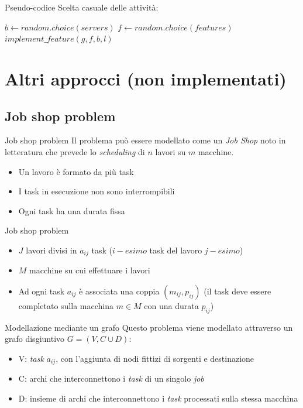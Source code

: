\documentclass{beamer}
\begin{document}
\begin{frame}{Pseudo-codice}
Scelta casuale delle attività:
\begin{algorithm}[H]
\begin{algorithmic}[1]
            \State $b \gets random.choice(servers)$
            \State $f \gets random.choice(features)$
            \State $implement\_feature(g, f, b, l)$
        \EndIf
    \EndFor
\EndFor
\end{algorithmic}
\end{algorithm}
\end{frame}

\section{Altri approcci (non implementati)}

\subsection{Job shop problem \cite{blazewicz2000disjunctive}}

\begin{frame}{Job shop problem}
Il problema può essere modellato come un \textit{Job Shop} noto in letteratura che prevede lo \textit{scheduling} di $n$ lavori su $m$ macchine.
\begin{itemize}
    \item Un lavoro è formato da più task
    \item I task in esecuzione non sono interrompibili
    \item Ogni task ha una durata fissa
\end{itemize}
\end{frame}

\begin{frame}{Job shop problem}
    \begin{itemize}
        \item $J$ lavori divisi in $a_{ij}$ task ($i-esimo$ task del lavoro $j-esimo$)
        \item $M$ macchine su cui effettuare i lavori
        \item Ad ogni task $a_{ij}$ è associata una coppia $(m_{ij},p_{ij})$ (il task deve essere completato sulla macchina $m \in M$ con una durata $p_{ij}$)
    \end{itemize}
\end{frame}

\begin{frame}{Modellazione mediante un grafo}
    Questo problema viene modellato attraverso un grafo disgiuntivo $G = (V, C \cup D)$:
    \begin{itemize}
        \item V: \textit{task} $a_{ij}$, con l'aggiunta di nodi fittizi di sorgenti e destinazione
        \item C: archi che interconnettono i \textit{task} di un singolo \textit{job}
        \item D: insieme di archi che interconnettono i \textit{task} processati sulla stessa macchina
    \end{itemize}
\end{frame}
\end{document}

